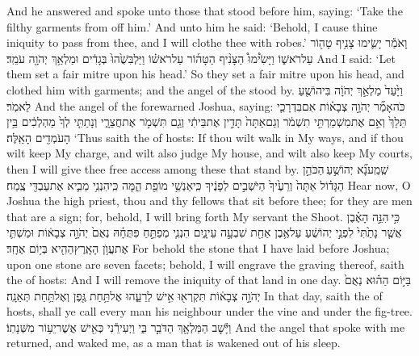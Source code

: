 {And he answered and spoke unto those that stood before him, saying: ‘Take the filthy garments from off him.’ And unto him he said: ‘Behold, I cause thine iniquity to pass from thee, and I will clothe thee with robes.’}
{וָאֹמַ֕ר יָשִׂ֛ימוּ צָנִ֥יף טָה֖וֹר עַל\maqqaf רֹאשׁ֑וֹ וַיָּשִׂ֩ימוּ֩ הַצָּנִ֨יף הַטָּה֜וֹר עַל\maqqaf רֹאשׁ֗וֹ וַיַּלְבִּשֻׁ֙הוּ֙ בְּגָדִ֔ים וּמַלְאַ֥ךְ יְהֹוָ֖ה עֹמֵֽד׃}
{And I said: ‘Let them set a fair mitre upon his head.’ So they set a fair mitre upon his head, and clothed him with garments; and the angel of the \lord\space stood by.}
{וַיָּ֙עַד֙ מַלְאַ֣ךְ יְהֹוָ֔ה בִּיהוֹשֻׁ֖עַ לֵאמֹֽר׃}
{And the angel of the \lord\space forewarned Joshua, saying:}
{כֹּה\maqqaf אָמַ֞ר יְהֹוָ֣ה צְבָא֗וֹת אִם\maqqaf בִּדְרָכַ֤י תֵּלֵךְ֙ וְאִ֣ם אֶת\maqqaf מִשְׁמַרְתִּ֣י תִשְׁמֹ֔ר וְגַם\maqqaf אַתָּה֙ תָּדִ֣ין אֶת\maqqaf בֵּיתִ֔י וְגַ֖ם תִּשְׁמֹ֣ר אֶת\maqqaf חֲצֵרָ֑י וְנָתַתִּ֤י לְךָ֙ מַהְלְכִ֔ים בֵּ֥ין הָעֹמְדִ֖ים הָאֵֽלֶּה׃}
{‘Thus saith the \lord\space of hosts: If thou wilt walk in My ways, and if thou wilt keep My charge, and wilt also judge My house, and wilt also keep My courts, then I will give thee free access among these that stand by.}
{שְֽׁמַֽע\maqqaf נָ֞א יְהוֹשֻׁ֣עַ \legarmeh  הַכֹּהֵ֣ן הַגָּד֗וֹל אַתָּה֙ וְרֵעֶ֙יךָ֙ הַיֹּשְׁבִ֣ים לְפָנֶ֔יךָ כִּֽי\maqqaf אַנְשֵׁ֥י מוֹפֵ֖ת הֵ֑מָּה כִּֽי\maqqaf הִנְנִ֥י מֵבִ֛יא אֶת\maqqaf עַבְדִּ֖י צֶֽמַח׃}
{Hear now, O Joshua the high priest, thou and thy fellows that sit before thee; for they are men that are a sign; for, behold, I will bring forth My servant the Shoot.}
{כִּ֣י \legarmeh  הִנֵּ֣ה הָאֶ֗בֶן אֲשֶׁ֤ר נָתַ֙תִּי֙ לִפְנֵ֣י יְהוֹשֻׁ֔עַ עַל\maqqaf אֶ֥בֶן אַחַ֖ת שִׁבְעָ֣ה עֵינָ֑יִם הִנְנִ֧י מְפַתֵּ֣חַ פִּתֻּחָ֗הּ נְאֻם֙ יְהֹוָ֣ה צְבָא֔וֹת וּמַשְׁתִּ֛י אֶת\maqqaf עֲוֺ֥ן הָאָֽרֶץ\maqqaf הַהִ֖יא בְּי֥וֹם אֶחָֽד׃}
{For behold the stone that I have laid before Joshua; upon one stone are seven facets; behold, I will engrave the graving thereof, saith the \lord\space of hosts: And I will remove the iniquity of that land in one day.}
{בַּיּ֣וֹם הַה֗וּא נְאֻם֙ יְהֹוָ֣ה צְבָא֔וֹת תִּקְרְא֖וּ אִ֣ישׁ לְרֵעֵ֑הוּ אֶל\maqqaf תַּ֥חַת גֶּ֖פֶן וְאֶל\maqqaf תַּ֥חַת תְּאֵנָֽה׃}
{In that day, saith the \lord\space of hosts, shall ye call every man his neighbour under the vine and under the fig-tree.}
\newperek
{}
{וַיָּ֕שׇׁב הַמַּלְאָ֖ךְ הַדֹּבֵ֣ר בִּ֑י וַיְעִירֵ֕נִי כְּאִ֖ישׁ אֲשֶׁר\maqqaf יֵע֥וֹר מִשְּׁנָתֽוֹ׃}
{And the angel that spoke with me returned, and waked me, as a man that is wakened out of his sleep.}
